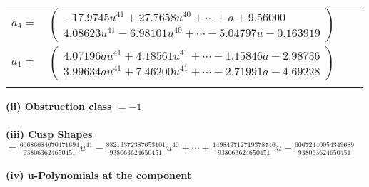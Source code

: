 \documentclass[1p]{elsarticle_modified}
\theoremstyle{definition}
\begin{document}
\begin{tabular}{m{7pt} m{180pt} m{7pt} m{180pt} }
\flushright $a_{4}=$&$\begin{pmatrix}-17.9745 u^{41}+27.7658 u^{40}+\cdots+a+9.56000\\4.08623 u^{41}-6.98101 u^{40}+\cdots-5.04797 u-0.163919\end{pmatrix}$ \\
\flushright $a_{1}=$&$\begin{pmatrix}4.07196 a u^{41}+4.18561 u^{41}+\cdots-1.15846 a-2.98736\\3.99634 a u^{41}+7.46200 u^{41}+\cdots-2.71991 a-4.69228\end{pmatrix}$\\&\end{tabular}
\flushleft \textbf{(ii) Obstruction class $= -1$}\\~\\
\flushleft \textbf{(iii) Cusp Shapes $= \frac{60686684670471694}{938063624650451} u^{41}-\frac{88213372387653101}{938063624650451} u^{40}+\cdots+\frac{149849712719378746}{938063624650451} u-\frac{60672440054349689}{938063624650451}$}\\~\\
\newpage\renewcommand{\arraystretch}{1}
\flushleft \textbf{(iv) u-Polynomials at the component}\newline \\
\end{document}
